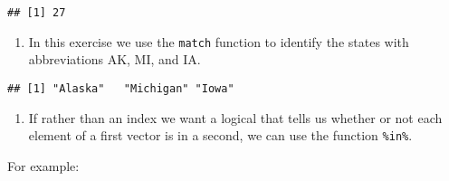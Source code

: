 \documentclass[
]{article}
\newenvironment{Shaded}{\begin{snugshade}}{\end{snugshade}}
\newcommand{\CommentTok}[1]{\textcolor[rgb]{0.56,0.35,0.01}{\textit{#1}}}
\newcommand{\DecValTok}[1]{\textcolor[rgb]{0.00,0.00,0.81}{#1}}
\newcommand{\KeywordTok}[1]{\textcolor[rgb]{0.13,0.29,0.53}{\textbf{#1}}}
\newcommand{\NormalTok}[1]{#1}
\newcommand{\OperatorTok}[1]{\textcolor[rgb]{0.81,0.36,0.00}{\textbf{#1}}}
\newcommand{\StringTok}[1]{\textcolor[rgb]{0.31,0.60,0.02}{#1}}
\providecommand{\tightlist}{%
  \setlength{\itemsep}{0pt}\setlength{\parskip}{0pt}}
\begin{document}
\begin{verbatim}
## [1] 27
\end{verbatim}

\begin{enumerate}
\def\labelenumi{\arabic{enumi}.}
\setcounter{enumi}{5}
\tightlist
\item
  In this exercise we use the \texttt{match} function to identify the
  states with abbreviations AK, MI, and IA.
\end{enumerate}

\begin{Shaded}
\end{Shaded}

\begin{verbatim}
## [1] "Alaska"   "Michigan" "Iowa"
\end{verbatim}

\begin{enumerate}
\def\labelenumi{\arabic{enumi}.}
\setcounter{enumi}{6}
\tightlist
\item
  If rather than an index we want a logical that tells us whether or not
  each element of a first vector is in a second, we can use the function
  \texttt{\%in\%}.
\end{enumerate}

For example:

\begin{Shaded}
\end{Shaded}
\end{document}
